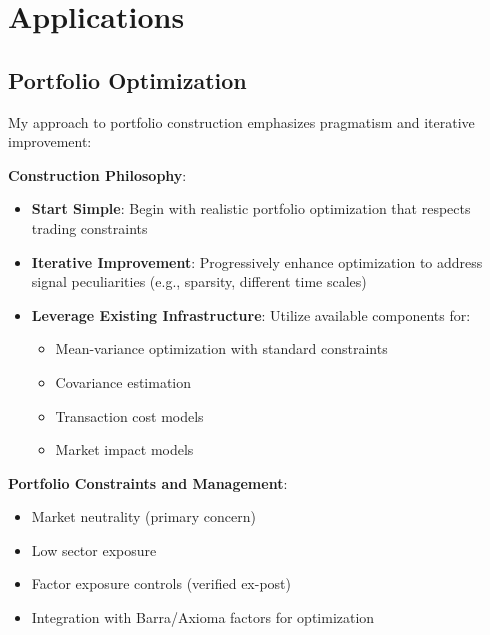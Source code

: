 \documentclass[11pt, letterpaper]{article}
\begin{document}
  \section{Applications}
  \label{applications}

  \subsection{Portfolio Optimization}
  \label{portfolio-optimization}

  My approach to portfolio construction emphasizes pragmatism and iterative
  improvement:

  \textbf{Construction Philosophy}:

  \begin{itemize}
    \item \textbf{Start Simple}: Begin with realistic portfolio optimization
      that respects trading constraints

    \item \textbf{Iterative Improvement}: Progressively enhance optimization
      to address signal peculiarities (e.g., sparsity, different time scales)

    \item \textbf{Leverage Existing Infrastructure}: Utilize available components
      for:

      \begin{itemize}
        \item Mean-variance optimization with standard constraints

        \item Covariance estimation

        \item Transaction cost models

        \item Market impact models
      \end{itemize}
  \end{itemize}

  \textbf{Portfolio Constraints and Management}:

  \begin{itemize}
    \item Market neutrality (primary concern)

    \item Low sector exposure

    \item Factor exposure controls (verified ex-post)

    \item Integration with Barra/Axioma factors for optimization
  \end{itemize}
\end{document}
